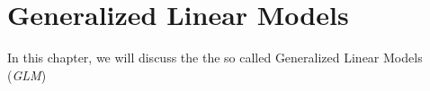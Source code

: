 \newcommand{\GLM}{\textit{GLM}}
\section{Generalized Linear Models}
In this chapter, we will discuss the the so called Generalized Linear Models (\GLM)


